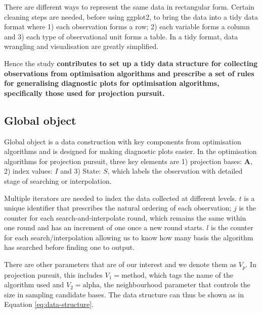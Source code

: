 \documentclass[12pt]{article}
\begin{document}
There are different ways to represent the same data in rectangular form.
Certain cleaning steps are needed, before using ggplot2, to bring the
data into a tidy data format \citep{wickham2014tidy} where 1) each
observation forms a row; 2) each variable forms a column and 3) each
type of observational unit forms a table. In a tidy format, data
wrangling and visualisation are greatly simplified.

Hence the study \textbf{contributes to set up a tidy data structure for
collecting observations from optimisation algorithms and prescribe a set
of rules for generalising diagnostic plots for optimisation algorithms,
specifically those used for projection pursuit.}

\hypertarget{global-object}{%
\subsection{Global object}\label{global-object}}

Global object is a data construction with key components from
optimisation algorithms and is designed for making diagnostic plots
easier. In the optimisation algorithms for projection pursuit, three key
elements are 1) projection bases: \(\mathbf{A}\), 2) index values: \(I\)
and 3) State: \(S\), which labels the observation with detailed stage of
searching or interpolation.

Multiple iterators are needed to index the data collected at different
levels. \(t\) is a unique identifier that prescribes the natural
ordering of each observation; \(j\) is the counter for each
search-and-interpolate round, which remains the same within one round
and has an increment of one once a new round starts. \(l\) is the
counter for each search/interpolation allowing us to know how many basis
the algorithm has searched before finding one to output.

There are other parameters that are of our interest and we denote them
as \emph{\(V_{p}\)}. In projection pursuit, this includes
\(V_1 = \text{method}\), which tags the name of the algorithm used and
\(V_2 = \text{alpha}\), the neighbourhood parameter that controls the
size in sampling candidate bases. The data structure can thus be shown
as in Equation \ref{eq:data-structure}.
\end{document}
